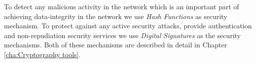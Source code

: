 



	To detect any malicious activity in the network which is an important part of achieving data-integrity in the network we use \textit{Hash Functions} as security mechanism.
	To protect against any active security attacks, provide authentication and non-repudiation security services we use \textit{Digital Signatures} as the security mechanisms.
	Both of these mechanisms are described in detail in Chapter \ref{cha:Cryptography tools}.	